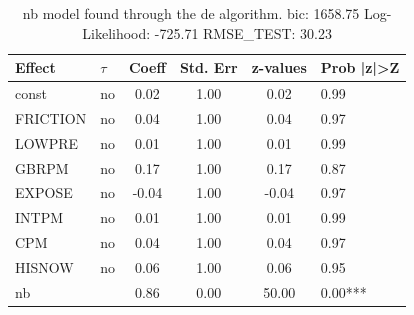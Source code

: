 \begin{table}
	\caption{nb model found through the de algorithm. bic: 1658.75 Log-Likelihood: -725.71 RMSE_TEST: 30.23}
	\begin{center}
		\begin{tabular}{|l|l|c|c|c|l|}
			\hline
			Effect & $\tau$ & Coeff & Std. Err & z-values & Prob |z|>Z \\
			\hline
			const & no & 0.02 & 1.00 & 0.02 & 0.99 \\
			\hline
			FRICTION & no & 0.04 & 1.00 & 0.04 & 0.97 \\
			\hline
			LOWPRE & no & 0.01 & 1.00 & 0.01 & 0.99 \\
			\hline
			GBRPM & no & 0.17 & 1.00 & 0.17 & 0.87 \\
			\hline
			EXPOSE & no & -0.04 & 1.00 & -0.04 & 0.97 \\
			\hline
			INTPM & no & 0.01 & 1.00 & 0.01 & 0.99 \\
			\hline
			CPM & no & 0.04 & 1.00 & 0.04 & 0.97 \\
			\hline
			HISNOW & no & 0.06 & 1.00 & 0.06 & 0.95 \\
			\hline
			nb &  & 0.86 & 0.00 & 50.00 & 0.00*** \\
			\hline
		\end{tabular}
	\end{center}
\end{table}